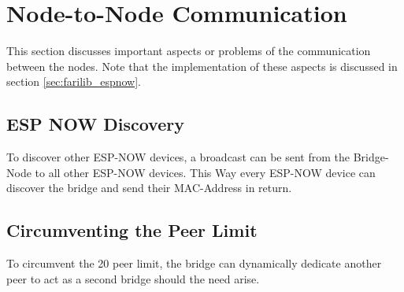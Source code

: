 \section{Node-to-Node Communication}
This section discusses important aspects or problems of the communication between
the nodes. Note that the implementation of these aspects is discussed in section
\ref{sec:farilib_espnow}.

    \subsection{ESP NOW Discovery}
    To discover other ESP-NOW devices, a broadcast can be sent
    from the Bridge-Node to all other ESP-NOW devices. This
    Way every ESP-NOW device can discover the bridge and send
    their MAC-Address in return.

    \subsection{Circumventing the Peer Limit}
    To circumvent the 20 peer limit, the bridge can dynamically
    dedicate another peer to act as a second bridge should the
    need arise. 
